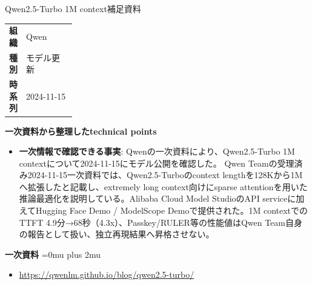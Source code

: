 \begin{technicalnote}{Qwen2.5-Turbo 1M context}{補足資料}
\begingroup
\begin{tabularx}{\linewidth}{@{}>{\bfseries}p{0.22\linewidth}X@{}}
組織 & Qwen \\
種別 & モデル更新 \\
時系列 & 2024-11-15 \\
\end{tabularx}
\smallskip
{\bfseries 一次資料から整理したtechnical points}
\begin{itemize}[leftmargin=1.5em,itemsep=0.35em]
\item \textbf{一次情報で確認できる事実}: Qwenの一次資料により、Qwen2.5-Turbo 1M contextについて2024-11-15にモデル公開を確認した。 Qwen Teamの受理済み2024-11-15一次資料では、Qwen2.5-Turboのcontext lengthを128Kから1Mへ拡張したと記載し、extremely long context向けにsparse attentionを用いた推論最適化を説明している。Alibaba Cloud Model StudioのAPI serviceに加えてHugging Face Demo / ModelScope Demoで提供された。1M contextでのTTFT 4.9分→68秒（4.3x）、Passkey/RULER等の性能値はQwen Team自身の報告として扱い、独立再現結果へ昇格させない。
\end{itemize}
\begin{minipage}{\linewidth}
\begin{samepage}
{\bfseries 一次資料}
\begingroup\sloppy
\Urlmuskip=0mu plus 2mu\relax
\begin{itemize}[leftmargin=1.5em,itemsep=0.25em]
\item {\scriptsize\url{https://qwenlm.github.io/blog/qwen2.5-turbo/}}
\end{itemize}
\endgroup
\end{samepage}
\end{minipage}
\endgroup
\end{technicalnote}
\medskip


